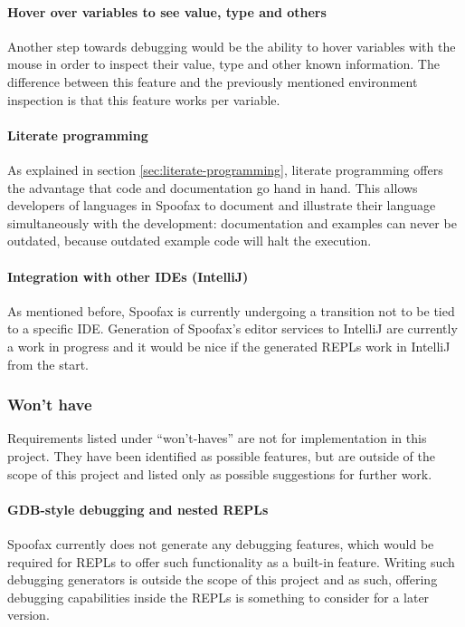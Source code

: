 \paragraph{Hover over variables to see value, type and others} Another step
towards debugging would be the ability to hover variables with the mouse in
order to inspect their value, type and other known information. The difference
between this feature and the previously mentioned environment inspection is that
this feature works per variable.

\paragraph{Literate programming} As explained in section
\cref{sec:literate-programming}, literate programming offers the advantage that
code and documentation go hand in hand. This allows developers of languages in
Spoofax to document and illustrate their language simultaneously with the
development: documentation and examples can never be outdated, because outdated
example code will halt the execution.

\paragraph{Integration with other IDEs (IntelliJ)} As mentioned before, Spoofax
is currently undergoing a transition not to be tied to a specific IDE.
Generation of Spoofax's editor services to IntelliJ are currently a work in
progress and it would be nice if the generated REPLs work in IntelliJ from the
start.

\subsubsection{Won't have}

Requirements listed under ``won't-haves'' are not for implementation in this
project. They have been identified as possible features, but are outside of the
scope of this project and listed only as possible suggestions for further work.

\paragraph{GDB-style debugging and nested REPLs} Spoofax currently does not
generate any debugging features, which would be required for REPLs to offer such
functionality as a built-in feature. Writing such debugging generators is
outside the scope of this project and as such, offering debugging capabilities
inside the REPLs is something to consider for a later version.

